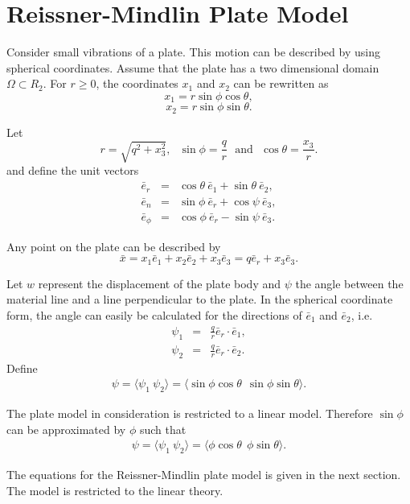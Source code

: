 \documentclass[../../main.tex]{subfiles}
\begin{document}
	\section{Reissner-Mindlin Plate Model} \label{sec:P_Model}
	Consider small vibrations of a plate. This motion can be described by using spherical coordinates. Assume that the plate has a two dimensional domain $\Omega \subset R_2$. For $r \geq 0$, the coordinates $x_1$ and $x_2$ can be rewritten as
	\[ x_1 = r \sin \phi \cos \theta, \]
	\[ x_2 = r \sin \phi \sin \theta. \]
	
	Let
	\[ r = \sqrt{q^2 + x_3^2},~~~\sin \phi = \frac{q}{r}~~~\textrm{and}~~~\cos \theta = \frac{x_3}{r}.\]
	and define the unit vectors
	\begin{eqnarray*}
		\bar e_r &=& \cos \theta ~\bar e_1 + \sin \theta ~\bar e_2,\\
		\bar e_n &=& \sin \phi~\bar e_r + \cos \psi~\bar e_3, \\
		\bar e_\phi &=& \cos \phi~\bar e_r - \sin \psi~\bar e_3.
	\end{eqnarray*}
	
	Any point on the plate can be described by
	\[ \bar{x} = x_1 \bar e_1 + x_2 \bar e_2 + x_3 \bar e_3 = q \bar e_r + x_3 \bar e_3. \]
	
	
	Let $w$ represent the displacement of the plate body and $\psi$ the angle between the material line and a line perpendicular to the plate. In the spherical coordinate form, the angle can easily be calculated for the directions of $\bar{e}_1$ and $\bar{e}_2$, i.e.
	\begin{eqnarray*}
		\psi_1 & = & \frac{q}{r} \bar{e}_r \cdot \bar{e}_1, \\
		\psi_2 & = & \frac{q}{r} \bar{e}_r \cdot \bar{e}_2.
	\end{eqnarray*}
	Define
	\begin{eqnarray*}
		{\psi} = \langle \psi_1 \  \psi_2\rangle = \langle \sin\phi \cos \theta \ \ \sin\phi \sin \theta\rangle.
	\end{eqnarray*}
	
	The plate model in consideration is restricted to a linear model. Therefore $\sin\phi$ can be approximated by $\phi$ such that
	\begin{eqnarray*}
		{\psi} = \langle \psi_1 \  \psi_2\rangle = \langle \phi \cos \theta \ \ \phi \sin \theta \rangle.
	\end{eqnarray*}
	
	The equations for the Reissner-Mindlin plate model is given in the next section. The model is restricted to the linear theory.
	
\end{document}
